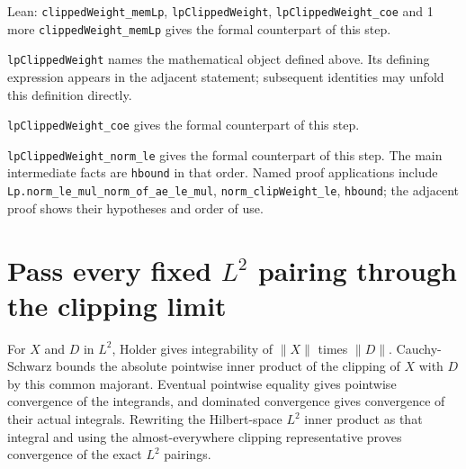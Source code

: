 \documentclass[11pt,a4paper]{article}
\begin{document}
\begin{leanbox}{Lean: \texttt{clippedWeight\_\allowbreak{}memLp}, \texttt{lpClippedWeight}, \texttt{lpClippedWeight\_\allowbreak{}coe} and 1 more}
\texttt{clipped\allowbreak{}Weight\_\allowbreak{}mem\allowbreak{}Lp} gives the formal counterpart of this step.




\texttt{lp\allowbreak{}Clipped\allowbreak{}Weight} names the mathematical object defined above. Its defining expression appears in the adjacent statement; subsequent identities may unfold this definition directly.




\texttt{lp\allowbreak{}Clipped\allowbreak{}Weight\_\allowbreak{}coe} gives the formal counterpart of this step.




\texttt{lp\allowbreak{}Clipped\allowbreak{}Weight\_\allowbreak{}norm\_\allowbreak{}le} gives the formal counterpart of this step. The main intermediate facts are \texttt{hbound} in that order. Named proof applications include \texttt{Lp.\allowbreak{}norm\_\allowbreak{}le\_\allowbreak{}mul\_\allowbreak{}norm\_\allowbreak{}of\_\allowbreak{}ae\_\allowbreak{}le\_\allowbreak{}mul}, \texttt{norm\_\allowbreak{}clip\allowbreak{}Weight\_\allowbreak{}le}, \texttt{hbound}; the adjacent proof shows their hypotheses and order of use.
\end{leanbox}

\section{\texorpdfstring{Pass every fixed \(L^{2}\) pairing through the clipping limit}{Pass every fixed L² pairing through the clipping limit}}


For \(X\) and \(D\) in \(L^{2}\), Holder gives integrability of \(\|X\|\) times \(\|D\|\). Cauchy-Schwarz bounds the absolute pointwise inner product of the clipping of \(X\) with \(D\) by this common majorant. Eventual pointwise equality gives pointwise convergence of the integrands, and dominated convergence gives convergence of their actual integrals. Rewriting the Hilbert-space \(L^{2}\) inner product as that integral and using the almost-everywhere clipping representative proves convergence of the exact \(L^{2}\) pairings.
\end{document}

